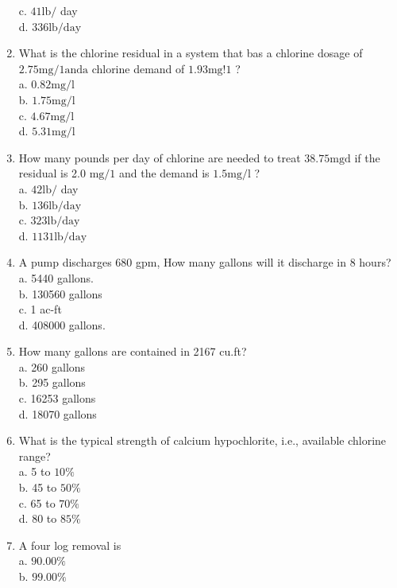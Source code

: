 \begin{enumerate}
c. $41 \mathrm{lb} /$ day\\
d. $336 \mathrm{lb} / \mathrm{day}$\\
\item What is the chlorine residual in a system that bas a chlorine dosage of $2.75 \mathrm{mg} / 1 \mathrm{and} \mathrm{a}$ chlorine demand of $1.93 \mathrm{mg} ! 1$ ?\\
a. $0.82 \mathrm{mg} / \mathrm{l}$\\
b. $1.75 \mathrm{mg} / \mathrm{l}$\\
c. $4.67 \mathrm{mg} / \mathrm{l}$\\
d. $5.31 \mathrm{mg} / \mathrm{l}$\\
\item How many pounds per day of chlorine are needed to treat $38.75 \mathrm{mgd}$ if the residual is 2.0 $\mathrm{mg} / 1$ and the demand is $1.5 \mathrm{mg} / \mathrm{l}$ ?\\
a. $42 \mathrm{lb} /$ day\\
b. $136 \mathrm{lb} / \mathrm{day}$\\
c. $323 \mathrm{lb} / \mathrm{day}$\\
d. $1131 \mathrm{lb} / \mathrm{day}$
\item A pump discharges 680 gpm, How many gallons will it discharge in 8 hours?\\
a. 5440 gallons.\\
b. 130560 gallons\\
c. 1 ac-ft\\
d. 408000 gallons.\\
\item How many gallons are contained in 2167 cu.ft?\\
a. 260 gallons\\
b. 295 gallons\\
c. 16253 gallons\\
d. 18070 gallons\\
\item What is the typical strength of calcium hypochlorite, i.e., available chlorine range?\\
a. 5 to $10 \%$\\
b. 45 to $50 \%$\\
c. 65 to $70 \%$\\
d. 80 to $85 \%$\\
\item A four log removal is\\
a. $90.00 \%$\\
b. $99.00 \%$\\

\end{enumerate}

